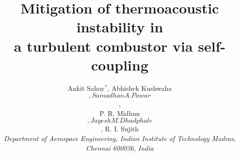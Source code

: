 \documentclass[twocolumn,10pt]{article} %
\begin{document}
\title{\LARGE Mitigation of thermoacoustic instability in \\
                     a turbulent combustor via self-coupling}

\author{{\large Ankit Sahay$^{*}$, Abhishek Kushwaha$$, Samadhan A. Pawar$$, \\ P. R. Midhun$$, Jayesh M. Dhadphale$$, R. I. Sujith }\\[10pt]
        {\footnotesize \em Department of Aerospace Engineering, Indian Institute of Technology Madras, Chennai 600036, India }\\[-5pt]}

\date{}


\small
\baselineskip 10pt

\end{document}
